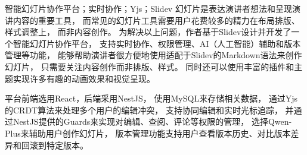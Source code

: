 

\begin{chineseabstract}
	{智能幻灯片协作平台；实时协作；Yjs；Slidev}
		幻灯片是表达演讲者想法和呈现演讲内容的重要工具，
		而常见的幻灯片工具需要用户花费较多的精力在布局排版、样式调整上，
		而非内容创作。
		为解决以上问题，作者基于Slidev设计并开发了一个智能幻灯片协作平台，
		支持实时协作、权限管理、AI（人工智能）辅助和版本管理等功能，
		能够帮助演讲者很方便地使用适配于Slidev的Markdown语法来创作幻灯片，
		只需要关注内容创作而非排版、样式。
		同时还可以使用丰富的插件和主题实现许多有趣的动画效果和视觉呈现。	
		
		平台前端选用React，后端采用NestJS，
		使用MySQL来存储相关数据，
		通过Yjs的CRDT算法来处理多个用户的编辑冲突，
		支持协同编辑和实时光标追踪，
		并通过NestJS提供的Guards来实现对编辑、查阅、评论等权限的管理，
		选择Qwen-Plus来辅助用户创作幻灯片，
		版本管理功能支持用户查看版本历史、对比版本差异和回滚到特定版本。
		

\end{chineseabstract}



